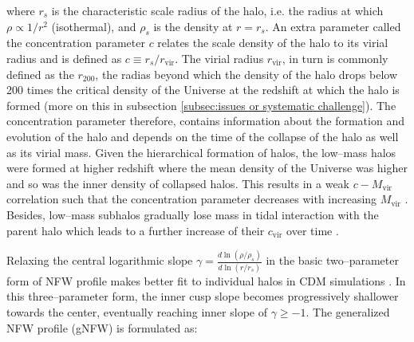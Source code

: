 \documentclass[paper=a4, fontsize=11pt]{scrartcl} %
\numberwithin{equation}{section} %
\numberwithin{figure}{section} %
\numberwithin{table}{section} %
\begin{document}
where $r_s$ is the characteristic scale radius of the halo, i.e. the radius at which $\rho \propto 1/r^2$ (isothermal), and $\rho_s$ is the density at $r=r_s$. An extra parameter called the concentration parameter $c$ relates the scale density of the halo to its virial radius and is defined as $c\equiv r_s/r_\mathrm{vir}$. The virial radius $r_\mathrm{vir}$, in turn is commonly defined as the $r_{200}$, the radias beyond which the density of the halo drops below 200 times the critical density of the Universe at the redshift at which the halo is formed (more on this in subsection \ref{subsec:issues or systematic challenge}). The concentration parameter therefore, contains information about the formation and evolution of the halo and depends on the time of the collapse of the halo as well as its virial mass. Given the hierarchical formation of halos, the low--mass halos were formed at higher redshift where the mean density of the Universe was higher and so was the inner density of collapsed halos. This results in a weak $c-M_\mathrm{vir}$ correlation such that the concentration parameter decreases with increasing $M_\mathrm{vir}$ \citep[][]{}. Besides, low--mass subhalos gradually lose mass in tidal interaction with the parent halo which leads to a further increase of their $c_\mathrm{vir}$ over time \citep{Bullock+2001, Maccio2008}.

Relaxing the central logarithmic slope $\gamma = \frac{d\ln(\rho/\rho_s)}{d\ln(r/r_s)}$ in the basic two--parameter form of NFW profile makes better fit to individual halos in CDM simulations \citep[][]{}. In this three--parameter form, the inner cusp slope becomes progressively shallower towards the center, eventually reaching inner slope of $\gamma\geq-1$. The generalized NFW profile (gNFW) is formulated as:
\end{document}
